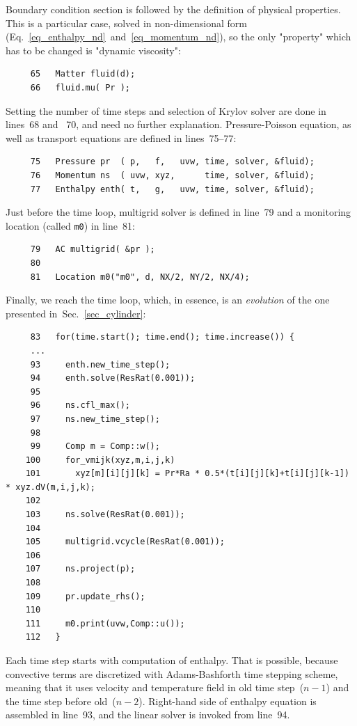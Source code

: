 Boundary condition section is followed by the definition of physical properties.
This is a particular case, solved in non-dimensional form 
(Eq.~\ref{eq_enthalpy_nd}~and~\ref{eq_momentum_nd}), so the
only "property" which has to be changed is "dynamic viscosity":
%
{\small \begin{verbatim}
     65   Matter fluid(d);
     66   fluid.mu( Pr );
\end{verbatim}}
%
Setting the number of time steps and selection of Krylov solver are done in 
lines~68 and ~70, and need no further explanation. 
Pressure-Poisson equation, as well as transport equations are defined in lines~75--77:
%
{\small \begin{verbatim}
     75   Pressure pr  ( p,   f,   uvw, time, solver, &fluid);
     76   Momentum ns  ( uvw, xyz,      time, solver, &fluid);
     77   Enthalpy enth( t,   g,   uvw, time, solver, &fluid);
\end{verbatim}}
%
Just before the time loop, multigrid solver is defined in line~79 and
a monitoring location (called {\tt m0}) in line~81:
%
{\small \begin{verbatim}
     79   AC multigrid( &pr );
     80
     81   Location m0("m0", d, NX/2, NY/2, NX/4);
\end{verbatim}}
%

Finally, we reach the time loop, which, in essence, is an {\em evolution} of
the one presented in~Sec.~\ref{sec_cylinder}:
%
{\small \begin{verbatim}
     83   for(time.start(); time.end(); time.increase()) {
     ...
     93     enth.new_time_step();
     94     enth.solve(ResRat(0.001));
     95
     96     ns.cfl_max();
     97     ns.new_time_step();
     98
     99     Comp m = Comp::w();
    100     for_vmijk(xyz,m,i,j,k)
    101       xyz[m][i][j][k] = Pr*Ra * 0.5*(t[i][j][k]+t[i][j][k-1]) * xyz.dV(m,i,j,k);
    102
    103     ns.solve(ResRat(0.001));
    104
    105     multigrid.vcycle(ResRat(0.001));
    106     
    107     ns.project(p);
    108
    109     pr.update_rhs();
    110
    111     m0.print(uvw,Comp::u());
    112   }
\end{verbatim}}
%
Each time step starts with computation of enthalpy. That is possible, because
convective terms are discretized with Adams-Bashforth time stepping scheme, 
meaning that it uses velocity and temperature field in old time step~($n-1$)
and the time step before old~($n-2$). Right-hand side of enthalpy equation
is assembled in line~93, and the linear solver is invoked from line~94.

